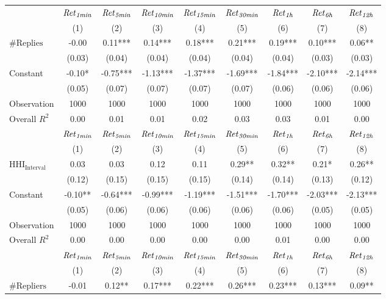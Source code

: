 \begin{tabular}{lcccccccc}
\hline
 & ${\it Ret}_{\it 1min}$ & ${\it Ret}_{\it 5min}$ & ${\it Ret}_{\it 10min}$ & ${\it Ret}_{\it 15min}$ & ${\it Ret}_{\it 30min}$ & ${\it Ret}_{\it 1h}$ & ${\it Ret}_{\it 6h}$ & ${\it Ret}_{\it 12h}$ \\
 & (1) & (2) & (3) & (4) & (5) & (6) & (7) & (8) \\
\hline
$\#\text{Replies}$ & -0.00 & 0.11*** & 0.14*** & 0.18*** & 0.21*** & 0.19*** & 0.10*** & 0.06** \\
 & (0.03) & (0.04) & (0.04) & (0.04) & (0.04) & (0.04) & (0.03) & (0.03) \\
Constant & -0.10* & -0.75*** & -1.13*** & -1.37*** & -1.69*** & -1.84*** & -2.10*** & -2.14*** \\
 & (0.05) & (0.07) & (0.07) & (0.07) & (0.07) & (0.06) & (0.06) & (0.06) \\
Observation & 1000 & 1000 & 1000 & 1000 & 1000 & 1000 & 1000 & 1000 \\
Overall $R^2$ & 0.00 & 0.01 & 0.01 & 0.02 & 0.03 & 0.03 & 0.01 & 0.00 \\
\hline
 & ${\it Ret}_{\it 1min}$ & ${\it Ret}_{\it 5min}$ & ${\it Ret}_{\it 10min}$ & ${\it Ret}_{\it 15min}$ & ${\it Ret}_{\it 30min}$ & ${\it Ret}_{\it 1h}$ & ${\it Ret}_{\it 6h}$ & ${\it Ret}_{\it 12h}$ \\
 & (1) & (2) & (3) & (4) & (5) & (6) & (7) & (8) \\
\hline
$\text{HHI}_{\text{Interval}}$ & 0.03 & 0.03 & 0.12 & 0.11 & 0.29** & 0.32** & 0.21* & 0.26** \\
 & (0.12) & (0.15) & (0.15) & (0.15) & (0.14) & (0.14) & (0.13) & (0.12) \\
Constant & -0.10** & -0.64*** & -0.99*** & -1.19*** & -1.51*** & -1.70*** & -2.03*** & -2.13*** \\
 & (0.05) & (0.06) & (0.06) & (0.06) & (0.06) & (0.06) & (0.05) & (0.05) \\
Observation & 1000 & 1000 & 1000 & 1000 & 1000 & 1000 & 1000 & 1000 \\
Overall $R^2$ & 0.00 & 0.00 & 0.00 & 0.00 & 0.00 & 0.01 & 0.00 & 0.00 \\
\hline
 & ${\it Ret}_{\it 1min}$ & ${\it Ret}_{\it 5min}$ & ${\it Ret}_{\it 10min}$ & ${\it Ret}_{\it 15min}$ & ${\it Ret}_{\it 30min}$ & ${\it Ret}_{\it 1h}$ & ${\it Ret}_{\it 6h}$ & ${\it Ret}_{\it 12h}$ \\
 & (1) & (2) & (3) & (4) & (5) & (6) & (7) & (8) \\
\hline
$\#\text{Repliers}$ & -0.01 & 0.12** & 0.17*** & 0.22*** & 0.26*** & 0.23*** & 0.13*** & 0.09** \\

\end{tabular}
